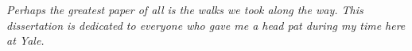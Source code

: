 \chapter*{}

\emph{
	Perhaps the greatest paper of all is the walks we took along the way.
	This dissertation is dedicated to everyone who gave me a head pat during my time here at Yale.
}